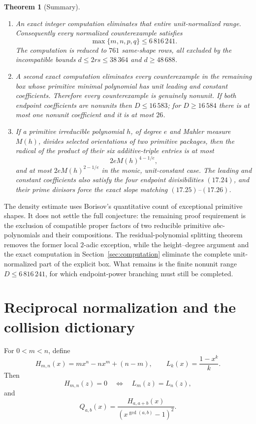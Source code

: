 \documentclass[11pt]{article}
\newtheorem{theorem}{Theorem}[section]
\theoremstyle{definition}
\begin{document}
\begin{theorem}[Summary]
\begin{enumerate}[label=(\roman*)]
\item An exact integer computation eliminates that entire unit-normalized
range.  Consequently every normalized counterexample satisfies
\[
 \boxed{\max\{m,n,p,q\}\leq6\,816\,241.}
\]
The computation is reduced to \(761\) same-shape rows, all excluded by the
incompatible bounds \(d\leq2rs\leq38\,364\) and \(d\geq48\,688\).

\item A second exact computation eliminates every counterexample in the
remaining box whose primitive minimal polynomial has unit leading and
constant coefficients.  Therefore every counterexample is genuinely
nonunit.  If both endpoint coefficients are nonunits then
\(D\leq16\,583\); for \(D\geq16\,584\) there is at most one nonunit
coefficient and it is at most \(26\).

\item If a primitive irreducible polynomial \(h\), of degree \(e\) and
Mahler measure \(M(h)\), divides selected orientations of two primitive
packages, then the radical of the product of their six additive-triple
entries is at most
\[
 2eM(h)^{4-1/e},
\]
and at most \(2eM(h)^{2-1/e}\) in the monic, unit-constant case.  The
leading and constant coefficients also satisfy the four endpoint
divisibilities \((17.24)\), and their prime divisors force the exact slope
matching \((17.25)\)--\((17.26)\).
\end{enumerate}
\end{theorem}

The density estimate uses Borisov's quantitative count of exceptional
primitive shapes.  It does not settle the full conjecture: the remaining
proof requirement is the exclusion of compatible proper factors of two
reducible primitive \(abc\)-polynomials and their compositions.  The
residual-polynomial splitting theorem removes the former local \(2\)-adic
exception, while the height--degree argument and the exact computation in
Section~\ref{sec:computation} eliminate the complete unit-normalized part of
the explicit box.  What remains is the finite nonunit range
\(D\leq6\,816\,241\), for which endpoint-power branching must still be
completed.

\section{Reciprocal normalization and the collision dictionary}
\label{sec:dictionary}

For \(0<m<n\), define
\[
 H_{m,n}(x)=mx^n-nx^m+(n-m),
 \qquad
 L_k(x)=\frac{1-x^k}{k}.
\]
Then
\begin{equation}
 H_{m,n}(z)=0
 \quad\Longleftrightarrow\quad
 L_m(z)=L_n(z),
 \tag{2.1}
\end{equation}
and
\begin{equation}
 Q_{a,b}(x)=
 \frac{H_{a,a+b}(x)}{(x^{\gcd(a,b)}-1)^2}.
 \tag{2.2}
\end{equation}
\end{document}
